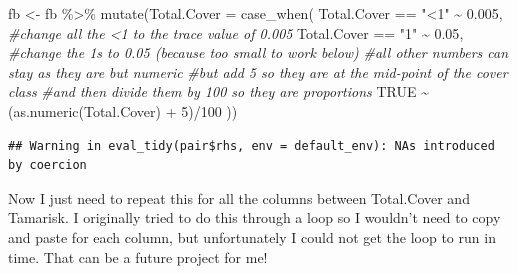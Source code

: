 \documentclass[
]{book}
\newenvironment{Shaded}{\begin{snugshade}}{\end{snugshade}}
\newcommand{\AttributeTok}[1]{\textcolor[rgb]{0.77,0.63,0.00}{#1}}
\newcommand{\CommentTok}[1]{\textcolor[rgb]{0.56,0.35,0.01}{\textit{#1}}}
\newcommand{\ConstantTok}[1]{\textcolor[rgb]{0.00,0.00,0.00}{#1}}
\newcommand{\DecValTok}[1]{\textcolor[rgb]{0.00,0.00,0.81}{#1}}
\newcommand{\FloatTok}[1]{\textcolor[rgb]{0.00,0.00,0.81}{#1}}
\newcommand{\FunctionTok}[1]{\textcolor[rgb]{0.00,0.00,0.00}{#1}}
\newcommand{\NormalTok}[1]{#1}
\newcommand{\OtherTok}[1]{\textcolor[rgb]{0.56,0.35,0.01}{#1}}
\newcommand{\SpecialCharTok}[1]{\textcolor[rgb]{0.00,0.00,0.00}{#1}}
\newcommand{\StringTok}[1]{\textcolor[rgb]{0.31,0.60,0.02}{#1}}
\begin{document}
\begin{Shaded}
\begin{Highlighting}[]
\NormalTok{fb }\OtherTok{\textless{}{-}}\NormalTok{ fb }\SpecialCharTok{\%\textgreater{}\%} 
  \FunctionTok{mutate}\NormalTok{(}\AttributeTok{Total.Cover =} \FunctionTok{case\_when}\NormalTok{(}
\NormalTok{  Total.Cover }\SpecialCharTok{==} \StringTok{"\textless{}1"} \SpecialCharTok{\textasciitilde{}} \FloatTok{0.005}\NormalTok{, }\CommentTok{\#change all the \textless{}1 to the trace value of 0.005}
\NormalTok{  Total.Cover }\SpecialCharTok{==} \StringTok{"1"} \SpecialCharTok{\textasciitilde{}} \FloatTok{0.05}\NormalTok{, }\CommentTok{\#change the 1s to 0.05 (because too small to work below)}
  \CommentTok{\#all other numbers can stay as they are but numeric}
  \CommentTok{\#but add 5 so they are at the mid{-}point of the cover class}
  \CommentTok{\#and then divide them by 100 so they are proportions}
  \ConstantTok{TRUE} \SpecialCharTok{\textasciitilde{}}\NormalTok{ (}\FunctionTok{as.numeric}\NormalTok{(Total.Cover) }\SpecialCharTok{+} \DecValTok{5}\NormalTok{)}\SpecialCharTok{/}\DecValTok{100}
\NormalTok{))}
\end{Highlighting}
\end{Shaded}

\begin{verbatim}
## Warning in eval_tidy(pair$rhs, env = default_env): NAs introduced by coercion
\end{verbatim}

Now I just need to repeat this for all the columns between Total.Cover and Tamarisk. I originally tried to do this through a loop so I wouldn't need to copy and paste for each column, but unfortunately I could not get the loop to run in time. That can be a future project for me!
\end{document}
